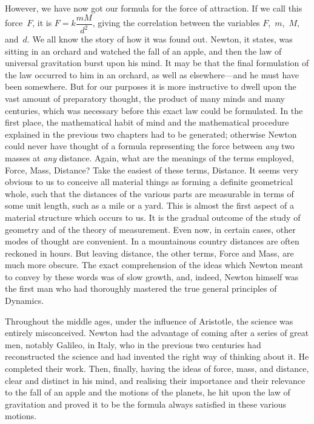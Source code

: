 \documentclass[12pt,leqno]{book}[2005/09/16]
\newcommand{\PageSep}[1]{\ignorespaces}
\begin{document}
However, we have now got our formula for
the force of attraction. If we call this force~$F$,
it is $F = k\dfrac{mM}{d^{2}}$, giving the correlation between
the variables $F$,~$m$,~$M$, and~$d$. We all
know the story of how it was found out.
Newton, it states, was sitting in an orchard
and watched the fall of an apple, and then
the law of universal gravitation burst upon
%
his mind. It may be that the final formulation
of the law occurred to him in an
orchard, as well as elsewhere---and he must
have been somewhere. But for our purposes
it is more instructive to dwell upon the vast
amount of preparatory thought, the product
of many minds and many centuries, which
was necessary before this exact law could be
formulated. In the first place, the mathematical
habit of mind and the mathematical
procedure explained in the previous two
chapters had to be generated; otherwise
Newton could never have thought of a formula
representing the force between \emph{any} two masses
\PageSep{30}
at \emph{any} distance. Again, what are the meanings
%
of the terms employed, Force, Mass, Distance?
%
%
Take the easiest of these terms,
Distance. It seems very obvious to us to
conceive all material things as forming a definite
geometrical whole, such that the distances
of the various parts are measurable in
terms of some unit length, such as a mile or
a yard. This is almost the first aspect of a
material structure which occurs to us. It is
the gradual outcome of the study of geometry
and of the theory of measurement. Even
now, in certain cases, other modes of thought
are convenient. In a mountainous country
distances are often reckoned in hours. But
leaving distance, the other terms, Force and
Mass, are much more obscure. The exact
comprehension of the ideas which Newton
%
meant to convey by these words was of slow
growth, and, indeed, Newton himself was the
first man who had thoroughly mastered the
true general principles of Dynamics.
%

Throughout the middle ages, under the influence
of Aristotle, the science was entirely
%
misconceived. Newton had the advantage of
coming after a series of great men, notably
Galileo, in Italy, who in the previous two
%
centuries had reconstructed the science and
had invented the right way of thinking about
it. He completed their work. Then, finally,
having the ideas of force, mass, and distance,
\PageSep{31}
clear and distinct in his mind, and realising
their importance and their relevance to the
fall of an apple and the motions of the planets,
he hit upon the law of gravitation and proved
it to be the formula always satisfied in these
various motions.
\end{document}

